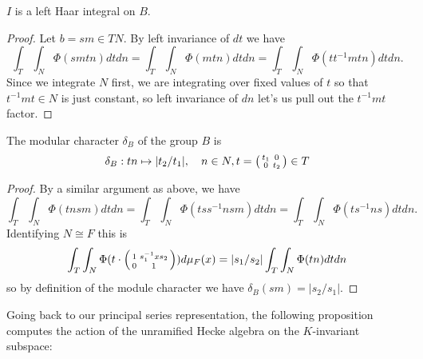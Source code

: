 \begin{prop}
    $I$ is a left Haar integral on $B$.
\end{prop}
\begin{proof}
    Let $b=sm \in TN$. By left invariance of $dt$ we have
    $$\int_T\int_N \Phi(smtn)dtdn = \int_T\int_N \Phi(mtn)dtdn = \int_T\int_N \Phi(tt^{-1}mtn)dtdn.$$
    Since we integrate $N$ first, we are integrating over fixed values of $t$ so that $t^{-1}mt \in N$ is just constant, so left invariance of $dn$ let's us pull out the $t^{-1}mt$ factor.
\end{proof}

\begin{prop}\label{prop:modularchar}
    The modular character $\delta_B$ of the group $B$ is
    $$\delta_B : tn \mapsto |t_2/t_1|, \quad n \in N, t = \begin{psmallmatrix}
        t_1 & 0 \\ 0 & t_2
    \end{psmallmatrix} \in T$$
\end{prop}
\begin{proof}
    By a similar argument as above, we have
    $$\int_T\int_N \Phi(tnsm) dtdn = \int_T\int_N \Phi(tss^{-1}nsm)dtdn = \int_T\int_N \Phi(ts^{-1}ns) dt dn.$$ Identifying $N \cong F$ this is
    $$\int_T\int_N \Phi(t \cdot \begin{psmallmatrix}
        1 & s_1^{-1}xs_2 \\0&1 
    \end{psmallmatrix}) d\mu_F(x) = |s_1/s_2|\int_T\int_N\Phi(tn)dtdn$$
    so by definition of the module character we have $\delta_B(sm) = |s_2/s_1|$.
\end{proof}

Going back to our principal series representation, the following proposition computes the action of the unramified Hecke algebra on the $K$-invariant subspace:

